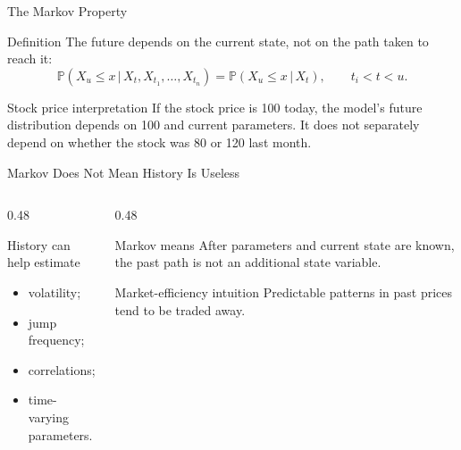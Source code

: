 \documentclass[aspectratio=169,11pt]{beamer}
\newcommand{\Prob}{\mathbb{P}}
\newcommand{\given}{\,|\,}
\begin{document}
\begin{frame}[label=markov_main]{The Markov Property}
    \begin{block}{Definition}
        The future depends on the current state, not on the path taken to reach it:
        \[
            \Prob(X_u\leq x\given X_t,X_{t_1},\ldots,X_{t_n})
            =
            \Prob(X_u\leq x\given X_t),
            \qquad t_i<t<u.
        \]
    \end{block}

    \begin{exampleblock}{Stock price interpretation}
        If the stock price is 100 today, the model's future distribution depends on 100 and current parameters.
        It does not separately depend on whether the stock was 80 or 120 last month.
    \end{exampleblock}

    \hyperlink{deriv_markov}{}
\end{frame}

\begin{frame}{Markov Does Not Mean History Is Useless}
    \begin{columns}[T]
        \begin{column}{0.48\textwidth}
            \begin{block}{History can help estimate}
                \begin{itemize}
                    \item volatility;
                    \item jump frequency;
                    \item correlations;
                    \item time-varying parameters.
                \end{itemize}
            \end{block}
        \end{column}
        \begin{column}{0.48\textwidth}
            \begin{block}{Markov means}
                After parameters and current state are known, the past path is not an additional state variable.
            \end{block}

            \begin{alertblock}{Market-efficiency intuition}
                Predictable patterns in past prices tend to be traded away.
            \end{alertblock}
        \end{column}
    \end{columns}
\end{frame}
\end{document}
